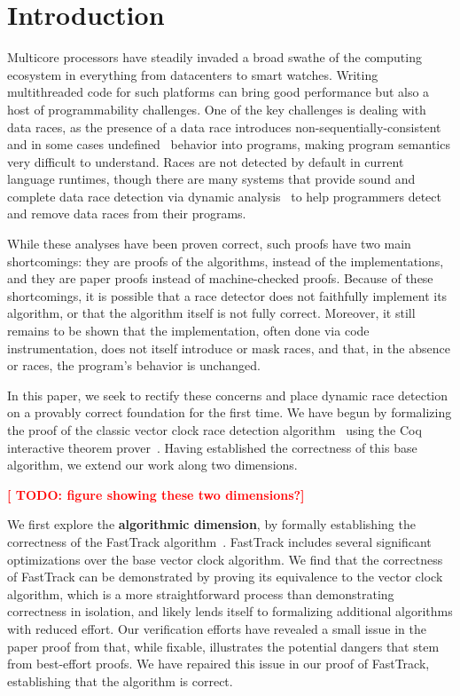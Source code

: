 \documentclass[preprint, 10pt]{sigplanconf}
\newcommand{\TODO}[1]{\textbf{\textcolor{red}{[ TODO: #1]}}}
\begin{document}
\section{Introduction}

Multicore processors have steadily invaded a broad swathe of the computing ecosystem in everything from datacenters to smart watches. Writing multithreaded code for such platforms can bring good performance but also a host of programmability challenges. One of the key challenges is dealing with data races, as the presence of a data race introduces non-sequentially-consistent~\cite{manson_java_2005} and in some cases undefined~\cite{boehm_foundations_2008} behavior into programs, making program semantics very difficult to understand. Races are not detected by default in current language runtimes, though there are many systems that provide sound and complete data race detection via dynamic analysis~\cite{djit+,fasttrack,slimstate,slimfast} to help programmers detect and remove data races from their programs. 

While these analyses have been proven correct, such proofs have two main shortcomings: they are proofs of the algorithms, instead of the implementations, and they are paper proofs instead of machine-checked proofs. Because of these shortcomings, it is possible that a race detector does not faithfully implement its algorithm, or that the algorithm itself is not fully correct. Moreover, it still remains to be shown that the implementation, often done via code instrumentation, does not itself introduce or mask races, and that, in the absence or races, the program's behavior is unchanged.

In this paper, we seek to rectify these concerns and place dynamic race detection on a provably correct foundation for the first time. We have begun by formalizing the proof of the classic vector clock race detection algorithm~\cite{vcfidge,vcmattern} using the Coq interactive theorem prover~\cite{coq}. Having established the correctness of this base algorithm, we extend our work along two dimensions. 

\TODO{figure showing these two dimensions?}

We first explore the \textbf{algorithmic dimension}, by formally establishing the correctness of the FastTrack algorithm~\cite{fasttrack}. FastTrack includes several significant optimizations over the base vector clock algorithm. We find that the correctness of FastTrack can be demonstrated by proving its equivalence to the vector clock algorithm, which is a more straightforward process than demonstrating correctness in isolation, and likely lends itself to formalizing additional algorithms with reduced effort. Our verification efforts have revealed a small issue in the paper proof from \cite{fasttrack} that, while fixable, illustrates the potential dangers that stem from best-effort proofs. We have repaired this issue in our proof of FastTrack, establishing that the algorithm is correct.
\end{document}
